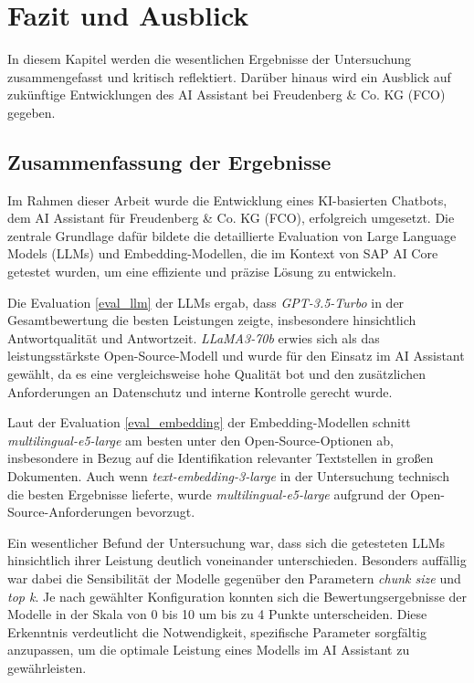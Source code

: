 \chapter{Fazit und Ausblick}
\label{fazit}

\nocite{*}

In diesem Kapitel werden die wesentlichen Ergebnisse der Untersuchung zusammengefasst und kritisch reflektiert. Darüber hinaus wird ein Ausblick auf zukünftige Entwicklungen des AI Assistant bei Freudenberg \& Co. KG (\ac{FCO}) gegeben. 

\section{Zusammenfassung der Ergebnisse}

Im Rahmen dieser Arbeit wurde die Entwicklung eines \ac{KI}-basierten Chatbots, dem AI Assistant für Freudenberg \& Co. KG (\ac{FCO}), erfolgreich umgesetzt. 
Die zentrale Grundlage dafür bildete die detaillierte Evaluation von Large Language Models (\acp{LLM}) und Embedding-Modellen, die im Kontext von SAP AI Core getestet wurden, um eine effiziente und präzise Lösung zu entwickeln.

Die Evaluation \ref{eval_llm} der \acp{LLM} ergab, dass \textit{GPT-3.5-Turbo} in der Gesamtbewertung die besten Leistungen zeigte, insbesondere hinsichtlich Antwortqualität und Antwortzeit. 
\textit{LLaMA3-70b} erwies sich als das leistungsstärkste Open-Source-Modell und wurde für den Einsatz im AI Assistant gewählt, da es eine vergleichsweise hohe Qualität bot und den zusätzlichen Anforderungen an Datenschutz und interne Kontrolle gerecht wurde.

Laut der Evaluation \ref{eval_embedding} der Embedding-Modellen schnitt \textit{multilingual-e5-large} am besten unter den Open-Source-Optionen ab, insbesondere in Bezug auf die Identifikation relevanter Textstellen in großen Dokumenten. 
Auch wenn \textit{text-embedding-3-large} in der Untersuchung technisch die besten Ergebnisse lieferte, wurde \textit{multilingual-e5-large} aufgrund der Open-Source-Anforderungen bevorzugt.

Ein wesentlicher Befund der Untersuchung war, dass sich die getesteten \acp{LLM} hinsichtlich ihrer Leistung deutlich voneinander unterschieden. 
Besonders auffällig war dabei die Sensibilität der Modelle gegenüber den Parametern \textit{chunk size} und \textit{top k}. 
Je nach gewählter Konfiguration konnten sich die Bewertungsergebnisse der Modelle in der Skala von 0 bis 10 um bis zu 4 Punkte unterscheiden. 
Diese Erkenntnis verdeutlicht die Notwendigkeit, spezifische Parameter sorgfältig anzupassen, um die optimale Leistung eines Modells im AI Assistant zu gewährleisten.

